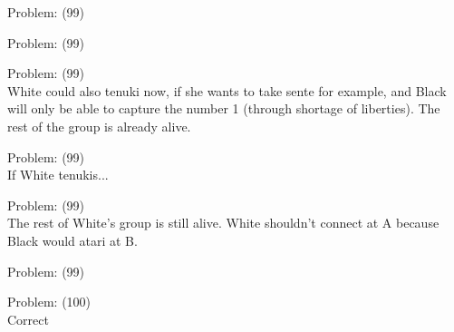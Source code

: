 \documentclass[11pt]{article}
\begin{document}
\begin{minipage}[t]{0.5\textwidth}
  {\centering
  
  Problem: (99)\\
  
  }
\end{minipage}
\begin{minipage}[t]{0.5\textwidth}
  {\centering
  
  Problem: (99)\\
  
  }
\end{minipage}
\begin{minipage}[t]{0.5\textwidth}
  {\centering
  
  Problem: (99)\\
  White could also tenuki now, if she wants to take sente for example, and Black will only be able to capture the number 1 (through shortage of liberties). The rest of the group is already alive.\\
  }
\end{minipage}
\begin{minipage}[t]{0.5\textwidth}
  {\centering
  
  Problem: (99)\\
  If White tenukis...\\
  }
\end{minipage}
\begin{minipage}[t]{0.5\textwidth}
  {\centering
  
  Problem: (99)\\
  The rest of White's group is still alive. White shouldn't connect at A because Black would atari at B.\\
  }
\end{minipage}
\begin{minipage}[t]{0.5\textwidth}
  {\centering
  
  Problem: (99)\\
  
  }
\end{minipage}
\begin{minipage}[t]{0.5\textwidth}
  {\centering
  
  Problem: (100)\\
  Correct\\
  }
\end{minipage}
\end{document}
